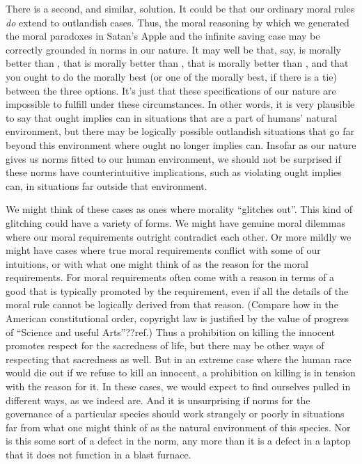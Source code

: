 There is a second, and similar, solution. It could be that our ordinary moral rules \textit{do} extend to outlandish
cases. Thus, the moral reasoning by which we generated the moral paradoxes in Satan's Apple and the 
infinite saving case may be correctly grounded in norms in our nature. It may well be that, say,
 is morally better than , that  is morally better than , 
that  is morally better than , and that you ought to do the morally best (or one
of the morally best, if there is a tie) between the three options. It's just that these specifications of 
our nature are impossible to fulfill under these circumstances. In other words, it is very plausible to
say that ought implies can in situations that are a part of humans' natural environment, but there may be
logically possible outlandish situations that go far beyond this environment where ought no longer implies can. 
Insofar as our nature gives us norms fitted to our human environment, we should not be surprised if these norms
have counterintuitive implications, such as violating ought implies can, in situations far outside that environment.

We might think of these cases as ones where morality ``glitches out''. This kind of glitching could have a variety
of forms. We might have genuine moral dilemmas where our moral requirements outright contradict each other. Or more
mildly we might have cases where true moral requirements conflict with some of our intuitions, or with what one might think of as the reason for the moral requirements. For moral requirements often come with a reason in terms of a good that
is typically promoted by the requirement, even if all the details of the moral rule cannot be logically derived from that reason.
(Compare how in the American constitutional order, copyright law is justified by the value of progress 
of ``Science and useful Arts''??ref.) Thus a prohibition on killing the innocent promotes respect for the sacredness of life,
but there may be other ways of respecting that sacredness as well. But in an extreme case where the human race would die out
if we refuse to kill an innocent, a prohibition on killing is in tension with the reason for it. In these cases, we would
expect to find ourselves pulled in different ways, as we indeed are. And it is unsurprising if norms for the governance of
a particular species should work strangely or poorly in situations far from what one might think of as the natural environment 
of this species. Nor is this some sort of a defect in the norm, any more than it is a defect in a laptop that it does not
function in a blast furnace.

